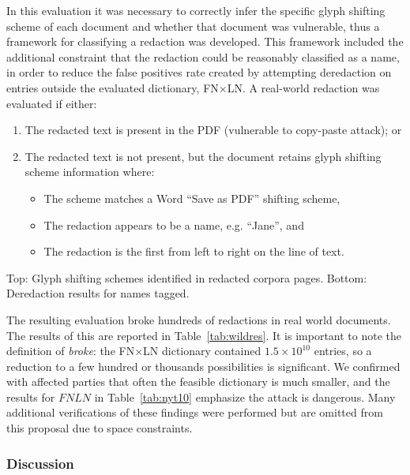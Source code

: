 In this evaluation it was necessary to correctly infer the specific glyph shifting scheme of each document and whether that document was vulnerable, thus a framework for classifying a redaction was developed.
This framework included the additional constraint that the redaction could be reasonably classified as a name, in order to reduce the false positives rate created by attempting deredaction on entries outside the evaluated dictionary, FN$\times$LN.
A real-world redaction was evaluated if either:
\begin{enumerate}[nosep]
    \item The redacted text is present in the PDF (vulnerable to copy-paste attack); or
    \item The redacted text is not present, but the document retains glyph shifting scheme information where:
        \begin{itemize}[nosep]
            \item The scheme matches a Word ``Save as PDF'' shifting scheme,
            \item The redaction appears to be a name, e.g. ``Jane'', and
            \item The redaction is the first from left to right on the line of text.
        \end{itemize}
\end{enumerate}

\begin{table}
  \centering
    \caption{Top: Glyph shifting schemes identified in redacted corpora pages. Bottom: Deredaction results for names tagged.}
\label{tab:wildres}
\small
\end{table}

The resulting evaluation broke hundreds of redactions in real world documents. 
The results of this are reported in Table~\ref{tab:wildres}.
It is important to note the definition of \emph{broke}: the FN$\times$LN dictionary contained $1.5 \times 10^{10}$ entries, so a reduction to a few hundred or thousands possibilities is significant.
We confirmed with affected parties that often the feasible dictionary is much smaller, and the results for $FNLN$ in Table~\ref{tab:nyt10} emphasize the attack is dangerous.
Many additional verifications of these findings were performed but are omitted from this proposal due to space constraints.

\subsubsection{Discussion}

